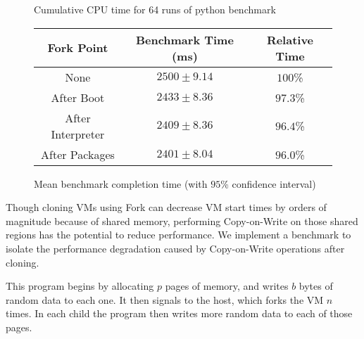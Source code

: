
\pgfplotsset{compat=1.5}
\begin{figure*}[t]
  \center
  \label{fig:pybench}
\caption{Cumulative CPU time for 64 runs of python benchmark}
\end{figure*}

\begin{figure*}
  \center
  \begin{tabular}{|c|c|c|}
    \hline
    Fork Point & Benchmark Time (ms) & Relative Time \\ \hline
    None & $2500 \pm 9.14$ & $100$\% \\ \hline
    After Boot & $2433 \pm 8.36$ & $97.3$\% \\ \hline
    After Interpreter & $2409 \pm 8.36$ & $96.4$\% \\ \hline
    After Packages & $2401 \pm 8.04$ & $96.0$\% \\ \hline
  \end{tabular}

  \caption{Mean benchmark completion time (with $95$\% confidence interval)}
\end{figure*}

Though cloning VMs using Fork can decrease VM start times by orders of
magnitude because of shared memory, performing Copy-on-Write on those shared
regions has the potential to reduce performance. We implement a benchmark to
isolate the performance degradation caused by Copy-on-Write operations after
cloning.

This program begins by allocating $p$ pages of memory, and writes $b$ bytes of
random data to each one. It then signals to the host, which forks the VM $n$
times. In each child the program then writes more random data to each of those
pages.

